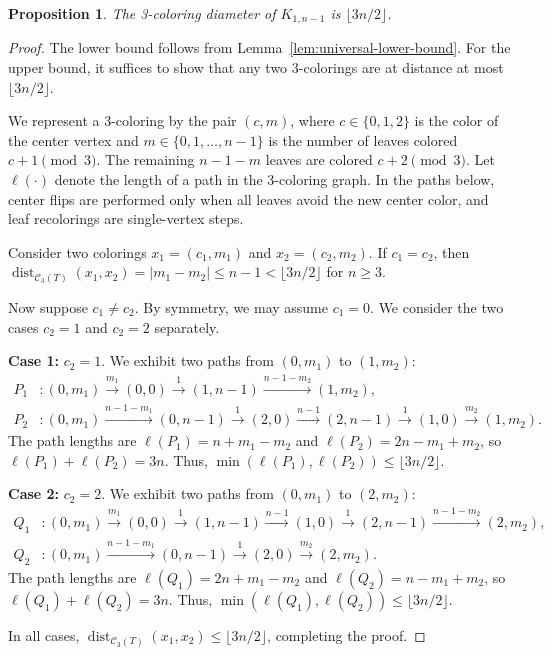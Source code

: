 \documentclass[12pt,reqno]{amsart}
\newtheorem{prop}[thm]{Proposition}
\theoremstyle{definition}
\newcommand{\C}{\mathcal{C}}
\newcommand{\dist}{\operatorname{dist}}
\begin{document}
\begin{prop}\label{prop:star}
The 3-coloring diameter of $K_{1, n-1}$ is $\lfloor 3n/2 \rfloor$.
\end{prop}
\begin{proof}
The lower bound follows from Lemma~\ref{lem:universal-lower-bound}. For the upper bound, it suffices to show that any two 3-colorings are at distance at most $\lfloor 3n/2 \rfloor$.

We represent a 3-coloring by the pair $(c, m)$, where $c \in \{0, 1, 2\}$ is the color of the center vertex and $m \in \{0, 1, \ldots, n-1\}$ is the number of leaves colored $c+1 \pmod{3}$. The remaining $n-1-m$ leaves are colored $c+2 \pmod{3}$. Let $\ell(\cdot)$ denote the length of a path in the 3-coloring graph. In the paths below, center flips are performed only when all leaves avoid the new center color, and leaf recolorings are single-vertex steps.

Consider two colorings $x_1 = (c_1, m_1)$ and $x_2 = (c_2, m_2)$. If $c_1 = c_2$, then $\dist_{\C_3(T)}(x_1, x_2) = |m_1 - m_2| \le n-1 < \lfloor 3n/2 \rfloor$ for $n \ge 3$.

Now suppose $c_1 \neq c_2$. By symmetry, we may assume $c_1 = 0$. We consider the two cases $c_2 = 1$ and $c_2 = 2$ separately.

\textbf{Case 1:} $c_2 = 1$. We exhibit two paths from $(0, m_1)$ to $(1, m_2)$:
\begin{align*}
P_1 &\colon (0, m_1) \xrightarrow{m_1} (0, 0) \xrightarrow{1} (1, n-1) \xrightarrow{n-1-m_2} (1, m_2), \\
P_2 &\colon (0, m_1) \xrightarrow{n-1-m_1} (0, n-1) \xrightarrow{1} (2, 0) \xrightarrow{n-1} (2, n-1) \xrightarrow{1} (1, 0) \xrightarrow{m_2} (1, m_2).
\end{align*}
The path lengths are $\ell(P_1) = n + m_1 - m_2$ and $\ell(P_2) = 2n - m_1 + m_2$, so $\ell(P_1) + \ell(P_2) = 3n$. Thus, $\min(\ell(P_1), \ell(P_2)) \le \lfloor 3n/2 \rfloor$.

\textbf{Case 2:} $c_2 = 2$. We exhibit two paths from $(0, m_1)$ to $(2, m_2)$:
\begin{align*}
Q_1 &\colon (0, m_1) \xrightarrow{m_1} (0, 0) \xrightarrow{1} (1, n-1) \xrightarrow{n-1} (1, 0) \xrightarrow{1} (2, n-1) \xrightarrow{n-1-m_2} (2, m_2), \\
Q_2 &\colon (0, m_1) \xrightarrow{n-1-m_1} (0, n-1) \xrightarrow{1} (2, 0) \xrightarrow{m_2} (2, m_2).
\end{align*}
The path lengths are $\ell(Q_1) = 2n + m_1 - m_2$ and $\ell(Q_2) = n - m_1 + m_2$, so $\ell(Q_1) + \ell(Q_2) = 3n$. Thus, $\min(\ell(Q_1), \ell(Q_2)) \le \lfloor 3n/2 \rfloor$.

In all cases, $\dist_{\C_3(T)}(x_1, x_2) \le \lfloor 3n/2 \rfloor$, completing the proof.
\end{proof}
\end{document}
